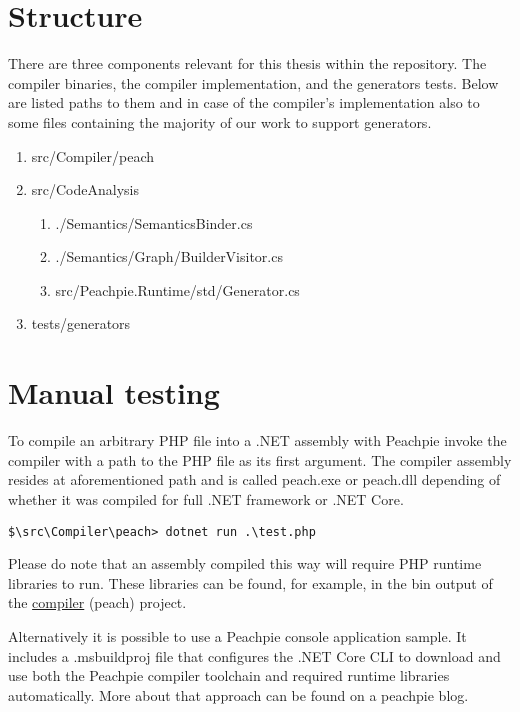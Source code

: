 \section{Structure}
There are three components relevant for this thesis within the repository. The compiler binaries, the compiler implementation, and the generators tests. Below are listed paths to them and in case of the compiler’s implementation also to some files containing the majority of our work to support generators.

\begin{enumerate}
	\item \label{peach}src/Compiler/peach	
	\item src/CodeAnalysis
	\begin{enumerate}
		\item ./Semantics/SemanticsBinder.cs
		\item ./Semantics/Graph/BuilderVisitor.cs
		\item src/Peachpie.Runtime/std/Generator.cs
	\end{enumerate}
	\item tests/generators
\end{enumerate}

\section{Manual testing}
To compile an arbitrary PHP file into a .NET assembly with Peachpie invoke the compiler with a path to the PHP file as its first argument. The compiler assembly resides at aforementioned path and is called peach.exe or peach.dll depending of whether it was compiled for full .NET framework or .NET Core.

\begin{verbatim}
$\src\Compiler\peach> dotnet run .\test.php
\end{verbatim}

Please do note that an assembly compiled this way will require PHP runtime libraries to run. These libraries can be found, for example, in the bin output of the \hyperref[peach]{compiler} (peach) project.

Alternatively it is possible to use a Peachpie console application sample\footnotemark. It includes a .msbuildproj file that configures the .NET Core CLI to download and use both the Peachpie compiler toolchain and required runtime libraries automatically. 
More about that approach can be found on a peachpie blog\footnotemark.



